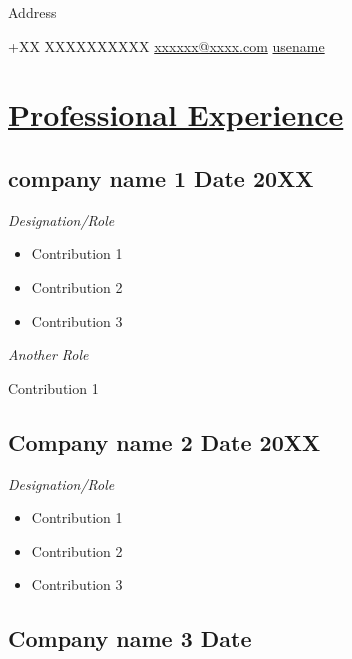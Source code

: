 \documentclass[a4paper,11pt]{article}
\newcommand{\longunderline}[1]{\uline{#1\hfill\mbox{}}}
\begin{document}
\begin{center}


	{\textbf{\Huge\color{MidnightBlue}{Name}}}

	Address
	
 +XX XXXXXXXXXX \href{mailto:xxxxxx@xxxx.com}{  xxxxxx@xxxx.com}
	 \href{https://www.github.com/username}{usename}

\end{center}


\section*{\longunderline{Professional Experience}}

	\subsection*{company name 1 \hfill Date 20XX} 
		
	\emph{Designation/Role}
			\begin{itemize}	[noitemsep,topsep=0pt]
				\item Contribution 1

				\item Contribution 2

				\item Contribution 3

			\end{itemize}

		\emph{Another Role}

		Contribution 1

	\subsection*{Company name 2 \hfill Date 20XX}
	
	\emph{Designation/Role}
		\begin{itemize}[noitemsep,topsep=0pt]
			\item Contribution 1

			\item Contribution 2
	
			\item Contribution 3
		\end{itemize}

	\subsection*{Company name 3 \hfill Date}
		
\end{document}
